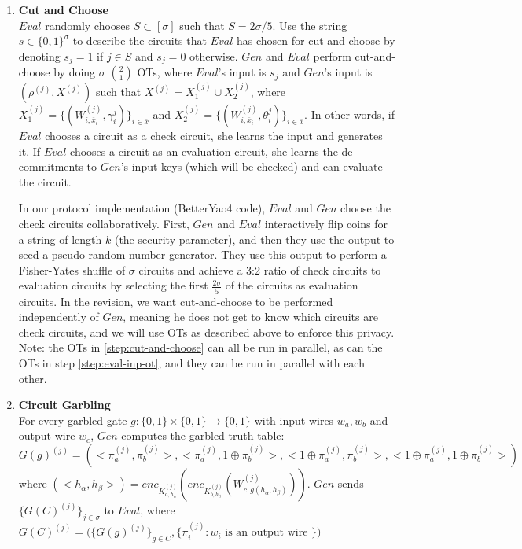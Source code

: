 \documentclass{article}
\begin{document}
\begin{enumerate}
	\item \label{step:cut-and-choose} \textbf{Cut and Choose}\\
	$Eval$ randomly chooses $S \subset [\sigma]$ such that $S = 2\sigma / 5$. Use the string $s \in \{0,1\}^{\sigma}$ to describe the circuits that $Eval$ has chosen for cut-and-choose by denoting $s_{j} = 1$ if $j \in S$ and $s_{j} = 0$ otherwise.  $Gen$ and $Eval$ perform cut-and-choose by doing $\sigma$ ${2 \choose 1}$ OTs, where $Eval$'s input is $s_{j}$ and $Gen$'s input is $(\rho^{(j)}, X^{(j)})$ such that $X^{(j)} = X_{1}^{(j)} \cup X_{2}^{(j)}$, where $X_{1}^{(j)} = \{(W_{i,\overline{x}_{i}}^{(j)},\gamma_{i}^{j})\}_{i \in \overline{x}}$ and $X_{2}^{(j)} = \{(W_{i,\overline{x}_{i}}^{(j)},\theta_{i}^{j})\}_{i \in \overline{x}}$. In other words, if $Eval$ chooses a circuit as a check circuit, she learns the input and generates it. If $Eval$ chooses a circuit as an evaluation circuit, she learns the de-commitments to $Gen$'s input keys (which will be checked) and can evaluate the circuit. \\
	
	In our protocol implementation (BetterYao4 code), $Eval$ and $Gen$ choose the check circuits collaboratively. First, $Gen$ and $Eval$ interactively flip coins for a string of length $k$ (the security parameter), and then they use the output to seed a pseudo-random number generator. They use this output to perform a Fisher-Yates shuffle of $\sigma$ circuits and achieve a 3:2 ratio of check circuits to evaluation circuits by selecting the first $\frac{2\sigma}{5}$ of the circuits as evaluation circuits.  In the revision, we want cut-and-choose to be performed independently of $Gen$, meaning he does not get to know which circuits are check circuits, and we will use OTs as described above to enforce this privacy.\\

	Note: the OTs in \ref{step:cut-and-choose} can all be run in parallel, as can the OTs in step \ref{step:eval-inp-ot}, and they can be run in parallel with each other. 
	
	\item \label{step:circuit-garbling} \textbf{Circuit Garbling}\\
	For every garbled gate $g: \{0,1\} \times \{0,1\} \rightarrow \{0,1\}$ with input wires $w_{a}, w_{b}$ and output wire $w_{c}$, $Gen$ computes the garbled truth table:
	$$G(g)^{(j)} = ( <\pi_{a}^{(j)}, \pi_{b}^{(j)}>,<\pi_{a}^{(j)}, 1 \oplus \pi_{b}^{(j)}>, < 1 \oplus \pi_{a}^{(j)}, \pi_{b}^{(j)}>,<1 \oplus  \pi_{a}^{(j)}, 1 \oplus \pi_{b}^{(j)}>)$$
	where $(<h_{\alpha},h_{\beta}>) = enc_{K_{a,h_{\alpha}}^{(j)}}(   enc_{K_{b,h_{\beta}}^{(j)}} ( W_{c,g(h_{\alpha},h_{\beta})}^{(j)} ))$.
	$Gen$ sends $\{ G(C)^{(j)} \}_{j \in \sigma}$ to $Eval$, where $G(C)^{(j)} = \big( \{G(g)^{(j)}\}_{g \in C}, \{ \pi_{i}^{(j)}: w_{i} \text{ is an output wire } \}  \big)$
		

\end{enumerate}
\end{document}
